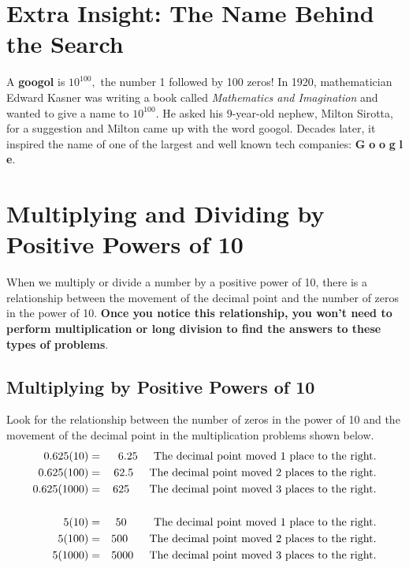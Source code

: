 \documentclass{ximera}
\begin{document}
\section*{Extra Insight: The Name Behind the Search}

A \textbf{googol} is $10^{100},$ the number 1 followed by 100 zeros!  In 1920, mathematician Edward Kasner was writing a book 
called \emph{Mathematics and Imagination} and wanted to give a name to $10^{100}.$  He asked his 9-year-old nephew, Milton Sirotta, 
for a suggestion and Milton came up with the word googol.  Decades later, it inspired the name of one of the largest 
and well known tech companies: \textcolor{googleblue}{\textbf{G}}%
\textcolor{googlered}{\textbf{o}}%
\textcolor{googleyellow}{\textbf{o}}%
\textcolor{googleblue}{\textbf{g}}%
\textcolor{googlegreen}{\textbf{l}}%
\textcolor{googlered}{\textbf{e}}.


\section*{Multiplying and Dividing by Positive Powers of 10}

When we multiply or divide a number by a positive power of 10, there is a relationship between the movement of the decimal point and the number of zeros
in the power of 10.  \textbf{Once you notice this relationship, you won't need to perform multiplication or long division to find the answers 
to these types of problems}.


\subsection*{Multiplying by Positive Powers of 10}

Look for the relationship between the number of zeros in the power of 10 and the movement of the decimal point in the multiplication problems shown below.
\begin{eqnarray*}
0.625 (10) &=& 6.25 \hspace{0.2in} \textrm{The decimal point moved 1 place to the right.} \\
0.625 (100) &=&  62.5  \hspace{0.2in} \textrm{The decimal point moved 2 places to the right.} \\
0.625 (1000) &=& 625 \hspace{0.25in} \textrm{The decimal point moved 3 places to the right.}\\
& & \\
5 (10) &=& 50 \hspace{0.34in} \textrm{The decimal point moved 1 place to the right.} \\
5 (100) &=&  500  \hspace{0.27in} \textrm{The decimal point moved 2 places to the right.} \\
5 (1000) &=& 5000 \hspace{0.2in} \textrm{The decimal point moved 3 places to the right.}
\end{eqnarray*}
\end{document}
